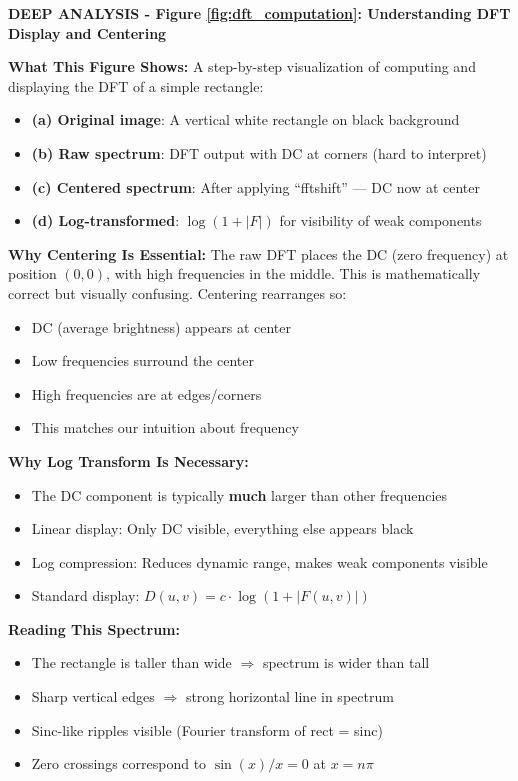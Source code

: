 \documentclass[12pt,a4paper]{article}
\begin{document}
\begin{deepexplanation}
\textbf{DEEP ANALYSIS - Figure \ref{fig:dft_computation}: Understanding DFT Display and Centering}

\textbf{What This Figure Shows:}
A step-by-step visualization of computing and displaying the DFT of a simple rectangle:
\begin{itemize}
    \item \textbf{(a) Original image}: A vertical white rectangle on black background
    \item \textbf{(b) Raw spectrum}: DFT output with DC at corners (hard to interpret)
    \item \textbf{(c) Centered spectrum}: After applying ``fftshift'' --- DC now at center
    \item \textbf{(d) Log-transformed}: $\log(1 + |F|)$ for visibility of weak components
\end{itemize}

\textbf{Why Centering Is Essential:}
The raw DFT places the DC (zero frequency) at position $(0, 0)$, with high frequencies in the middle. This is mathematically correct but visually confusing. Centering rearranges so:
\begin{itemize}
    \item DC (average brightness) appears at center
    \item Low frequencies surround the center
    \item High frequencies are at edges/corners
    \item This matches our intuition about frequency
\end{itemize}

\textbf{Why Log Transform Is Necessary:}
\begin{itemize}
    \item The DC component is typically \textbf{much} larger than other frequencies
    \item Linear display: Only DC visible, everything else appears black
    \item Log compression: Reduces dynamic range, makes weak components visible
    \item Standard display: $D(u,v) = c \cdot \log(1 + |F(u,v)|)$
\end{itemize}

\textbf{Reading This Spectrum:}
\begin{itemize}
    \item The rectangle is taller than wide $\Rightarrow$ spectrum is wider than tall
    \item Sharp vertical edges $\Rightarrow$ strong horizontal line in spectrum
    \item Sinc-like ripples visible (Fourier transform of rect = sinc)
    \item Zero crossings correspond to $\sin(x)/x = 0$ at $x = n\pi$
\end{itemize}
\end{deepexplanation}
\end{document}
